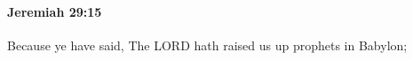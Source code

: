 
		\paragraph{Jeremiah 29:15} %
			\label{JEREMIAH-29-15}

			Because ye have said, The LORD hath raised us up prophets in Babylon;


